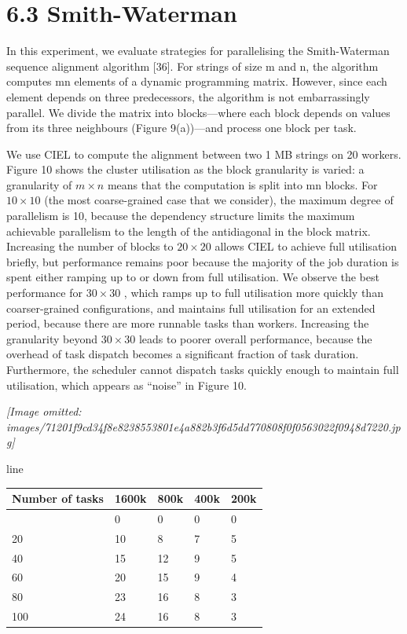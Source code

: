 \documentclass[
]{article}
\newcounter{none} %
\begin{document}
\section{6.3 Smith-Waterman}\label{smith-waterman}

In this experiment, we evaluate strategies for parallelising the
Smith-Waterman sequence alignment algorithm {[}36{]}. For strings of
size m and n, the algorithm computes mn elements of a dynamic
programming matrix. However, since each element depends on three
predecessors, the algorithm is not embarrassingly parallel. We divide
the matrix into blocks---where each block depends on values from its
three neighbours (Figure 9(a))---and process one block per task.

We use CIEL to compute the alignment between two 1 MB strings on 20
workers. Figure 10 shows the cluster utilisation as the block
granularity is varied: a granularity of \(m \times n\) means that the
computation is split into mn blocks. For \(10 \times 10\) (the most
coarse-grained case that we consider), the maximum degree of parallelism
is 10, because the dependency structure limits the maximum achievable
parallelism to the length of the antidiagonal in the block matrix.
Increasing the number of blocks to \(20 \times 20\) allows CIEL to
achieve full utilisation briefly, but performance remains poor because
the majority of the job duration is spent either ramping up to or down
from full utilisation. We observe the best performance for
\(30 \times 30\) , which ramps up to full utilisation more quickly than
coarser-grained configurations, and maintains full utilisation for an
extended period, because there are more runnable tasks than workers.
Increasing the granularity beyond \(30 \times 30\) leads to poorer
overall performance, because the overhead of task dispatch becomes a
significant fraction of task duration. Furthermore, the scheduler cannot
dispatch tasks quickly enough to maintain full utilisation, which
appears as ``noise'' in Figure 10.

\textit{[Image omitted: images/71201f9cd34f8e8238553801e4a882b3f6d5dd770808f0f0563022f0948d7220.jpg]}

line

{\def\LTcaptype{none} %
\begin{longtable}[]{@{}lllll@{}}
\toprule\noalign{}
Number of tasks & 1600k & 800k & 400k & 200k \\
\midrule\noalign{}
\endhead
\bottomrule\noalign{}
\endlastfoot
0 & 0 & 0 & 0 & 0 \\
20 & 10 & 8 & 7 & 5 \\
40 & 15 & 12 & 9 & 5 \\
60 & 20 & 15 & 9 & 4 \\
80 & 23 & 16 & 8 & 3 \\
100 & 24 & 16 & 8 & 3 \\
\end{longtable}
}
\end{document}

